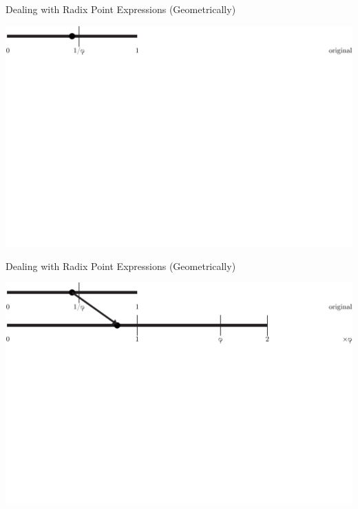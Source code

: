 \documentclass{beamer}
\begin{document}
\begin{frame}{Dealing with Radix Point Expressions (Geometrically)}
  \begin{example}
    \includegraphics[width=\textwidth,height=0.75\textheight]{images/Phinary/1}
  \end{example}
\end{frame}

\begin{frame}{Dealing with Radix Point Expressions (Geometrically)}
  \addtocounter{framenumber}{-1}
  \begin{example}
    \includegraphics[width=\textwidth,height=0.75\textheight]{images/Phinary/2}
  \end{example}
\end{frame}
\end{document}
